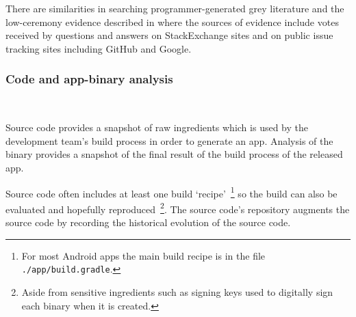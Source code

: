 

There are similarities in searching programmer-generated grey literature and the low-ceremony evidence described in \citet{scaffidi2007_toawards_a_calculus_of_confidence, scaffidi2007developing} where the sources of evidence include votes received by questions and answers on StackExchange sites and on public issue tracking sites including GitHub and Google. %

\subsubsection{Code and app-binary analysis}~\label{section-code-analysis-research-method}   

Source code provides a snapshot of raw ingredients which is used by the development team's build process in order to generate an app. Analysis of the binary provides a snapshot of the final result of the build process of the released app.

Source code often includes at least one build `recipe'~\footnote{For most Android apps the main build recipe is in the file \texttt{./app/build.gradle}.} so the build can also be evaluated and hopefully reproduced~\footnote{Aside from sensitive ingredients such as signing keys used to digitally sign each binary when it is created.}. The source code's repository augments the source code by recording the historical evolution of the source code.

